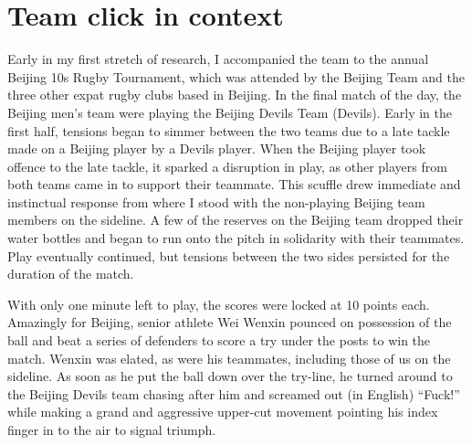 
\begin{savequote}[8cm]

  \qauthor{}
\end{savequote}



\chapter{Team click in context \label{chap:ethnoResults}}

\minitoc






                                      \begin{CJK}{UTF8}{gbsn}





Early in my first stretch of research, I accompanied the team to the annual Beijing 10s Rugby Tournament, which was attended by the Beijing Team and the three other expat rugby clubs based in Beijing.  In the final match of the day, the Beijing men's team were playing the Beijing Devils Team (Devils).  Early in the first half, tensions began to simmer between the two teams due to a late tackle made on a Beijing player by a Devils player.  When the Beijing player took offence to the late tackle, it sparked a disruption in play, as other players from both teams came in to support their teammate.  This scuffle drew immediate and instinctual response from where I stood with the non-playing Beijing team members on the sideline.  A few of the reserves on the Beijing team dropped their water bottles and began to run onto the pitch in solidarity with their teammates.  Play eventually continued, but tensions between the two sides persisted for the duration of the match.

With only one minute left to play, the scores were locked at 10 points each.  Amazingly for Beijing, senior athlete Wei Wenxin pounced on possession of the ball and beat a series of defenders to score a try under the posts to win the match.  Wenxin was elated, as were his teammates, including those of us on the sideline.  As soon as he put the ball down over the try-line, he turned around to the Beijing Devils team chasing after him and screamed out (in English) ``Fuck!'' while making a grand and aggressive upper-cut movement pointing his index finger in to the air to signal triumph.


\end{CJK}
